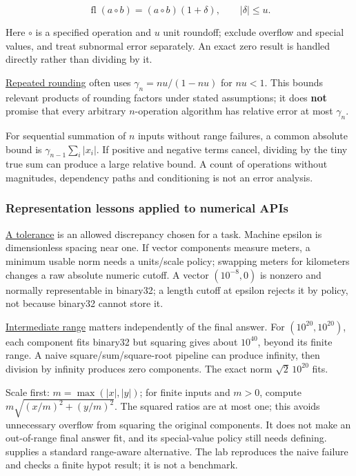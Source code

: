 \[
\operatorname{fl}(a\circ b)=(a\circ b)(1+\delta),\qquad |\delta|\le u.
\]

Here \(\circ\) is a specified operation and \(u\) unit roundoff; exclude overflow and special values, and treat subnormal error separately. An exact zero result is handled directly rather than dividing by it.

\hyperref[appendix-f82e270791c8]{Repeated rounding} often uses \(\gamma_n=nu/(1-nu)\) for \(nu<1\). This bounds relevant products of rounding factors under stated assumptions; it does \textbf{not} promise that every arbitrary \(n\)-operation algorithm has relative error at most \(\gamma_n\).

For sequential summation of \(n\) inputs without range failures, a common absolute bound is \(\gamma_{n-1}\sum_i|x_i|\). If positive and negative terms cancel, dividing by the tiny true sum can produce a large relative bound. A count of operations without magnitudes, dependency paths and conditioning is not an error analysis.

\subsubsection{Representation lessons applied to numerical APIs}\label{01-foundations-i-ch001-representation-lessons-applied-to-numerical-apis}

\hypertarget{01-foundations-i-ch001-representation-lessons-applied-to-numerical-apis}{}

\hyperref[appendix-0ec599f8ba27]{A tolerance} is an allowed discrepancy chosen for a task. Machine epsilon is dimensionless spacing near one. If vector components measure meters, a minimum usable norm needs a units/scale policy; swapping meters for kilometers changes a raw absolute numeric cutoff. A vector \((10^{-8},0)\) is nonzero and normally representable in binary32; a length cutoff at epsilon rejects it by policy, not because binary32 cannot store it.

\hyperref[appendix-7f1e17dcafb1]{Intermediate range} matters independently of the final answer. For \((10^{20},10^{20})\), each component fits binary32 but squaring gives about \(10^{40}\), beyond its finite range. A naive square/sum/square-root pipeline can produce infinity, then division by infinity produces zero components. The exact norm \(\sqrt2\,10^{20}\) fits.

Scale first: \(m=\max(|x|,|y|)\); for finite inputs and \(m>0\), compute \(m\sqrt{(x/m)^2+(y/m)^2}\). The squared ratios are at most one; this avoids unnecessary overflow from squaring the original components. It does not make an out-of-range final answer fit, and its special-value policy still needs defining.  supplies a standard range-aware alternative. The lab reproduces the naive failure and checks a finite hypot result; it is not a benchmark.

